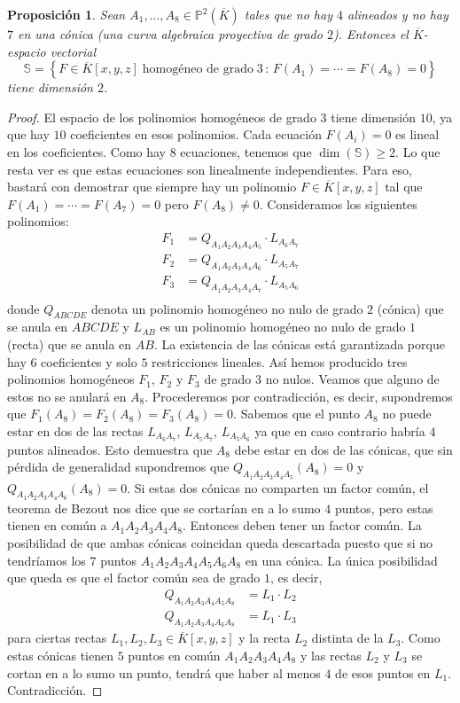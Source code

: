 \documentclass[a4paper, 11pt]{article}
\newcommand{\PP}{\mathbb{P}}
\theoremstyle{plain}
\newtheorem{prop}[teor]{Proposición}
\theoremstyle{definition}
\begin{document}
\begin{prop}
Sean $A_1,\ldots,A_8\in\PP^2(\overline{K})$ tales que no hay $4$ alineados y no hay
$7$ en una cónica (una curva algebraica proyectiva de grado $2$). Entonces el
$\overline{K}$-espacio vectorial
\[
\mathbb{S}=\left\{F\in\overline{K}[x,y,z]\;\text{homogéneo de grado}\;3\,:\,
F(A_1)=\cdots=F(A_8)=0\right\}
\]
tiene dimensión $2$.
\end{prop}
\begin{proof}
El espacio de los polinomios homogéneos de grado $3$ tiene dimensión $10$, ya que
hay $10$ coeficientes en esos polinomios. Cada ecuación $F(A_i)=0$ es lineal en los
coeficientes. Como hay $8$ ecuaciones, tenemos que $\dim(\mathbb{S})\geq 2$. Lo que
resta ver es que estas ecuaciones son linealmente independientes. Para eso, bastará
con demostrar que siempre hay un polinomio $F\in\overline{K}[x,y,z]$ tal que
$F(A_1)=\cdots=F(A_7)=0$ pero $F(A_8)\neq0$. Consideramos los siguientes polinomios:
\[
\begin{aligned}
F_1 &= Q_{A_1A_2A_3A_4A_5}\cdot L_{A_6A_7} \\
F_2 &= Q_{A_1A_2A_3A_4A_6}\cdot L_{A_5A_7} \\
F_3 &= Q_{A_1A_2A_3A_4A_7}\cdot L_{A_5A_6} \\
\end{aligned}
\]
donde $Q_{ABCDE}$ denota un polinomio homogéneo no nulo de grado $2$ (cónica) que se
anula en $ABCDE$ y $L_{AB}$ es un polinomio homogéneo no nulo de grado $1$ (recta) que
se anula en $AB$. La existencia de las cónicas está garantizada porque hay $6$ coeficientes
y solo $5$ restricciones lineales. Así hemos producido tres polinomios homogéneos $F_1$,
$F_2$ y $F_3$ de grado $3$ no nulos. Veamos que alguno de estos no se anulará en $A_8$.
Procederemos por contradicción, es decir, supondremos que $F_1(A_8)=F_2(A_8)=F_3(A_8)=0$.
Sabemos que el punto $A_8$ no puede estar en dos de las rectas $L_{A_6A_7}$, $L_{A_5A_7}$,
$L_{A_5A_6}$ ya que en caso contrario habría $4$ puntos alineados. Esto demuestra que
$A_8$ debe estar en dos de las cónicas, que sin pérdida de generalidad supondremos que
$Q_{A_1A_2A_3A_4A_5}(A_8)=0$ y $Q_{A_1A_2A_3A_4A_6}(A_8)=0$. Si estas dos cónicas no
comparten un factor común, el teorema de Bezout nos dice que se cortarían en a lo sumo
$4$ puntos, pero estas tienen en común a $A_1A_2A_3A_4A_8$. Entonces deben tener un
factor común. La posibilidad de que ambas cónicas coincidan queda descartada puesto
que si no tendríamos los $7$ puntos $A_1A_2A_3A_4A_5A_6A_8$ en una cónica. La única
posibilidad que queda es que el factor común sea de grado $1$, es decir,
\[
\begin{aligned}
Q_{A_1A_2A_3A_4A_5A_8} &= L_1\cdot L_2 \\
Q_{A_1A_2A_3A_4A_6A_8} &= L_1\cdot L_3
\end{aligned}
\]
para ciertas rectas $L_1,L_2,L_3\in\overline{K}[x,y,z]$ y la recta $L_2$ distinta de
la $L_3$. Como estas cónicas tienen $5$ puntos en común $A_1A_2A_3A_4A_8$ y las rectas
$L_2$ y $L_3$ se cortan en a lo sumo un punto, tendrá que haber al menos $4$ de esos
puntos en $L_1$. Contradicción.
\end{proof}
\end{document}
